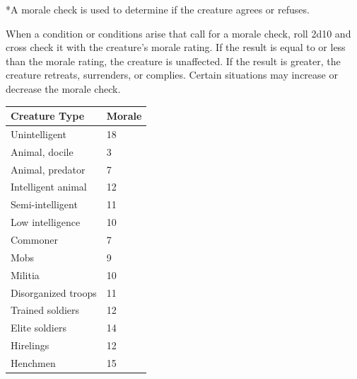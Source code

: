 \begin{multicols}{2}
\begin{itemize}
\end{itemize}

*A morale check is used to determine if the creature agrees or refuses.

\vspace{1em}

When a condition or conditions arise that call for a morale check, roll 2d10 and cross check it with the creature's morale rating.  If the result is equal to or less than the morale rating, the creature is unaffected.  If the result is greater, the creature retreats, surrenders, or complies.  Certain situations may increase or decrease the morale check.

\noindent
\begin{minipage}{\columnwidth}

\label{basemorale}
\noindent
\begin{tabular}{|p{}|p{}|}
\hline
Creature Type	& Morale \\
\hline\hline
\rowcolor[gray]{.9}Unintelligent	& 18 \\
Animal, docile	& 3 \\
\rowcolor[gray]{.9}Animal, predator	& 7 \\
Intelligent animal	& 12 \\
\rowcolor[gray]{.9}Semi-intelligent	& 11 \\
Low intelligence	& 10 \\
\rowcolor[gray]{.9}Commoner	& 7 \\
Mobs	& 9 \\
\rowcolor[gray]{.9}Militia	& 10 \\
Disorganized troops	& 11 \\
\rowcolor[gray]{.9}Trained soldiers	& 12 \\
Elite soldiers	& 14 \\
\rowcolor[gray]{.9}Hirelings	& 12 \\
Henchmen	& 15 \\
\hline
\end{tabular}

\end{minipage}

\noindent
\begin{minipage}{\columnwidth}


\end{minipage}
\end{multicols}
